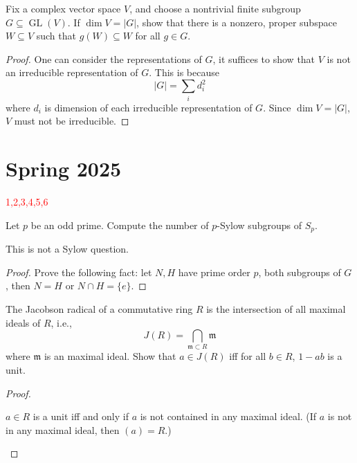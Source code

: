 \documentclass[openany]{book}
\begin{document}
\begin{prob}
    Fix a complex vector space $V$, and choose a nontrivial finite subgroup $G\subseteq\operatorname{GL}(V)$. If $\dim V=\left|G\right|$, show that there is a nonzero, proper subspace $W\subseteq V$ such that $g(W)\subseteq W$ for all $g\in G$.
\end{prob}
\begin{proof}
    One can consider the representations of $G$, it suffices to show that $V$ is not an irreducible representation of $G$. This is because 
    \begin{equation*}
        |G|=\sum_id_i^2
    \end{equation*}
    where $d_i$ is dimension of each irreducible representation of $G$. Since $\dim V=|G|$, $V$ must not be irreducible.
\end{proof}




\chapter{Spring 2025}


\textcolor{red}{1,2,3,4,5,6}


\begin{prob}[Q1]
    Let $p$ be an odd prime. Compute the number of $p$-Sylow subgroups of $S_p$. 
\end{prob}
\begin{warn}
    This is not a Sylow question. 
\end{warn}
\begin{proof}
    Prove the following fact: let $N,H$ have prime order $p$, both subgroups of $G$, then $N=H$ or $N\cap H=\{e\}$.
\end{proof}



\begin{prob}[Q2]
    The Jacobson radical of a commutative ring $R$ is the intersection of all maximal ideals of $R$, i.e., 
    \begin{equation*}
        J(R)=\bigcap_{\mathfrak{m}\subset R} \mathfrak{m}
    \end{equation*}
    where $\mathfrak{m}$ is an maximal ideal. Show that $a\in J(R)$ iff for all $b\in R$, $1-ab$ is a unit.
\end{prob}
\begin{proof}
    \begin{lem}
        $a\in R$ is a unit iff and only if $a$ is not contained in any maximal ideal. (If $a$ is not in any maximal ideal, then $(a)=R$.)
    \end{lem}
\end{proof}
\end{document}
